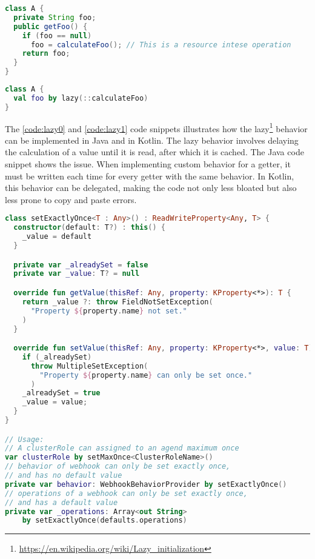 \begin{lstlisting}[caption={Lazy getter in Java},language=Java,label=code:lazy0]
class A {
  private String foo;
  public getFoo() {
    if (foo == null) 
      foo = calculateFoo(); // This is a resource intese operation
    return foo;
  }
}
\end{lstlisting}
    
\begin{lstlisting}[caption={Lazy property in Kotlin},language=Kotlin,label=code:lazy1]
class A {
  val foo by lazy(::calculateFoo)
}
\end{lstlisting}

The \ref{code:lazy0} and \ref{code:lazy1} code snippets illustrates how the lazy\footnote{\url{https://en.wikipedia.org/wiki/Lazy_initialization}} behavior can be implemented in Java and in Kotlin. The lazy behavior involves delaying the calculation of a value until it is read, after which it is cached. The Java code snippet shows the issue. When implementing custom behavior for a getter, it must be written each time for every getter with the same behavior. In Kotlin, this behavior can be delegated, making the code not only less bloated but also less prone to copy and paste errors.

\begin{minipage}{\linewidth}
\begin{lstlisting}[caption={setExactlyOnce implementation},language=Kotlin,label=code:setonce]
class setExactlyOnce<T : Any>() : ReadWriteProperty<Any, T> {
  constructor(default: T?) : this() {
    _value = default
  }

  private var _alreadySet = false
  private var _value: T? = null

  override fun getValue(thisRef: Any, property: KProperty<*>): T {
    return _value ?: throw FieldNotSetException(
      "Property ${property.name} not set."
    )
  }

  override fun setValue(thisRef: Any, property: KProperty<*>, value: T) {
    if (_alreadySet)
      throw MultipleSetException(
        "Property ${property.name} can only be set once."
      )
    _alreadySet = true
    _value = value;
  }
}

// Usage:
// A clusterRole can assigned to an agend maximum once
var clusterRole by setMaxOnce<ClusterRoleName>()
// behavior of webhook can only be set exactly once,
// and has no default value
private var behavior: WebhookBehaviorProvider by setExactlyOnce()
// operations of a webhook can only be set exactly once,
// and has a default value
private var _operations: Array<out String>
    by setExactlyOnce(defaults.operations)
\end{lstlisting}
\end{minipage}

